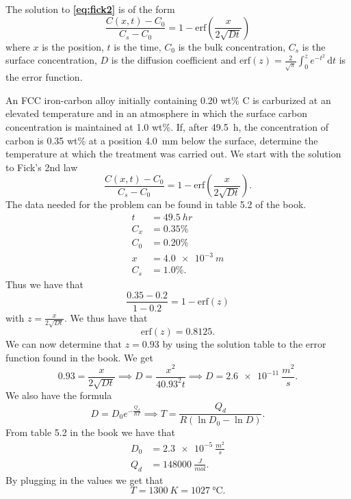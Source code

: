 The solution to \textbf{\autoref{eq:fick2}} is of the form
\[ 
\frac{C(x,t) - C_0}{C_s - C_0} = 1 - \mathrm{erf}\left( \frac{x}{2 \sqrt{D t}} \right)
\]
where $x$ is the position, $t$ is the time, $C_0$ is the bulk concentration, $C_s$ is the surface concentration, $D$ is the diffusion coefficient and $\mathrm{erf}(z) = \frac{2}{\sqrt{\pi}} \int_{0}^{z} e^{-t^2} \, \mathrm{d}t$ is the error function. 

\begin{exa}
  An FCC iron-carbon alloy initially containing \num{0,20} wt\% C is carburized at an elevated temperature and in an atmosphere in which the surface carbon concentration is maintained at \num{1,0} wt\%. If, after \qty{49,5}{h}, the concentration of carbon is \num{0,35} wt\% at a position \qty{4,0}{mm} below the surface, determine the temperature at which the treatment was carried out.
  \bigbreak
  We start with the solution to Fick's 2nd law
  \[ 
  \frac{C(x,t) - C_0}{C_s - C_0} = 1 - \mathrm{erf} \left( \frac{x}{2 \sqrt{Dt}} \right)
  .\]
  The data needed for the problem can be found in table 5.2 of the book.
  \begin{align*}
    t &= \qty{49,5}{hr} \\
    C_x &= \num{0,35} \%  \\ 
    C_0 &= \num{0,20} \% \\
    x &= \qty{4,0e-3}{m}  \\
    C_s &= \num{1,0} \%
  .\end{align*}
  Thus we have that
  \[ 
  \frac{\num{0,35} - \num{0,2}}{1 - \num{0,2}} = 1 - \mathrm{erf}(z)
  \]
  with $z = \frac{x}{2 \sqrt{D t}}$. We thus have that
  \[ 
  \mathrm{erf}(z) = \num{0,8125}
  .\]
  We can now determine that $z = \num{0,93}$ by using the solution table to the error function found in the book. We get
  \[ 
  \num{0,93}  = \frac{x}{2 \sqrt{Dt}} \implies D = \frac{x^2}{4\num{0,93}^2 t} \implies D = \qty{2,6e-11}{\frac{m^2}{s}} 
  .\]
  We also have the formula
  \[ 
  D = D_0 e^{- \frac{Q_d}{RT}} \implies T = \frac{Q_d}{R \left( \ln D_0 - \ln D \right)}
  .\]
  From table 5.2 in the book we have that
  \begin{align*}
    D_0 &= \qty{2,3e-5}{\frac{m^2}{s}}  \\
    Q_d &= \qty{148000}{\frac{J}{mol}}
  .\end{align*}
  By plugging in the values we get that
  \[ 
  T = \qty{1300}{K} = \qty{1027}{\celsius} 
  .\]
\end{exa}

